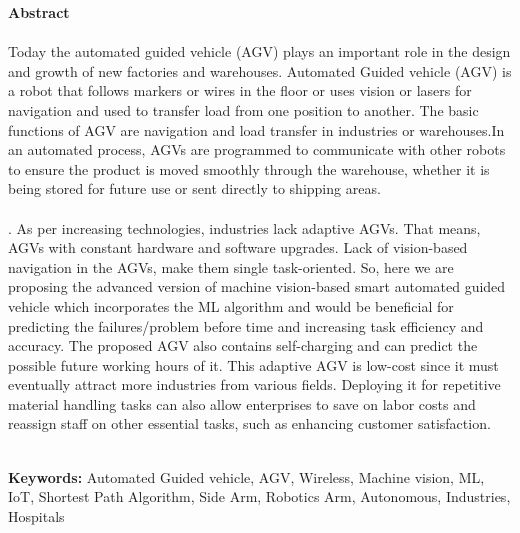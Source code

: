 \begin{center}
\thispagestyle{empty}
\vspace{2cm}
\LARGE{\textbf{Abstract}}\\[1.0cm]
\end{center}
\large{\paragraph{} Today the automated guided vehicle (AGV) plays an important role in the design and growth of new factories and warehouses. Automated Guided vehicle (AGV) is a robot that follows markers or wires in the floor or uses vision or lasers for navigation and used to transfer load from one position to another. The basic functions of AGV are navigation and load transfer in industries or warehouses.In an automated process, AGVs are programmed to communicate with other robots to ensure the product is moved smoothly through the warehouse, whether it is being stored for future use or sent directly to shipping areas.
}
\large{\paragraph{}. As per increasing technologies, industries lack adaptive AGVs. That means, AGVs with constant hardware and software upgrades. Lack of vision-based navigation in the AGVs, make them single task-oriented. So, here we are proposing the advanced version of machine vision-based smart automated guided vehicle which incorporates the ML algorithm and would be beneficial for predicting the failures/problem before time and increasing task efficiency and accuracy. The proposed AGV also contains self-charging and can predict the possible future working hours of it. This adaptive AGV is low-cost since it must eventually attract more industries from various fields. Deploying it for repetitive material handling tasks can also allow enterprises to save on labor costs and reassign staff on other essential tasks, such as enhancing customer satisfaction. }\\

\textbf{Keywords: }Automated Guided vehicle, AGV, Wireless, Machine vision, ML, IoT, Shortest Path Algorithm, Side Arm, Robotics Arm, Autonomous, Industries, Hospitals